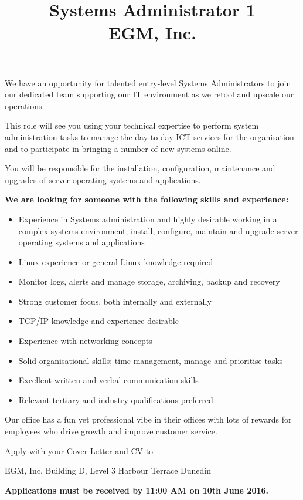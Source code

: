 \documentclass{article}   	%
\title{Systems Administrator 1\\EGM, Inc.}
\begin{document}
\maketitle
We have an opportunity for talented entry-level Systems Administrators to join our dedicated team supporting our IT environment as we retool and upscale our operations.
 
This role will see you using your technical expertise to perform system administration tasks to manage the day-to-day ICT services for the organisation and to participate in bringing a number of new systems online.
 
You will be responsible for the installation, configuration, maintenance and upgrades of server operating systems and applications.
 

\textbf{We are looking for someone with the following skills and experience:}
\begin{itemize}
\item Experience in Systems administration and highly desirable working in a complex systems environment; install, configure, maintain and upgrade server operating systems and applications
\item Linux experience or general Linux knowledge required
\item Monitor logs, alerts and manage storage, archiving, backup and recovery
\item Strong customer focus, both internally and externally  
\item TCP/IP knowledge and experience desirable
\item Experience with networking concepts
\item Solid organisational skills; time management, manage and prioritise tasks
\item Excellent written and verbal communication skills
\item Relevant tertiary and industry qualifications preferred
\end{itemize}

Our office has a fun yet professional vibe in their offices with lots of rewards for employees who drive growth and improve customer service.
 
Apply with your Cover Letter and CV to


EGM, Inc.
Building D, Level 3
Harbour Terrace
Dunedin

\textbf{Applications must be received by 11:00 AM on 10th June 2016.}
\end{document}
